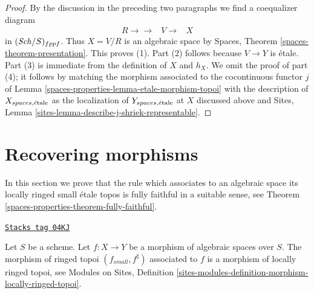 \begin{proof}
\medskip\noindent
By the discussion in the preceding two paragraphs we find a
coequalizer diagram
$$
\begin{array}{ccc}R \longrightarrow\longrightarrow & V \longrightarrow & X\end{array}
$$
in $(\mathit{Sch}/S)_{fppf}$. Thus $X = V/R$ is an algebraic space by
Spaces, Theorem \ref{spaces-theorem-presentation}. This proves (1).
Part (2) follows because $V \to Y$ is \'etale. Part (3) is immediate
from the definition of $X$ and $h_X$. We omit the proof of part (4);
it follows by matching the morphism associated to the cocontinuous
functor $j$ of Lemma \ref{spaces-properties-lemma-etale-morphism-topoi}
with the description of $X_{spaces, \acute{e}\text{tale}}$ as the localization
of $Y_{spaces, \acute{e}\text{tale}}$ at $X$ discussed above and
Sites, Lemma \ref{sites-lemma-describe-j-shriek-representable}.
\end{proof}

\section{Recovering morphisms}
\label{spaces-properties-section-morphisms}
In this section we prove that the rule which associates to an algebraic space
its locally ringed small \'etale topos is fully faithful in a suitable
sense, see
Theorem \ref{spaces-properties-theorem-fully-faithful}.

\begin{lemma}
\label{spaces-properties-lemma-morphism-locally-ringed}
\href{https://stacks.math.columbia.edu/tag/04KJ}{\texttt{Stacks tag 04KJ}}

Let $S$ be a scheme.
Let $f : X \to Y$ be a morphism of algebraic spaces over $S$.
The morphism of ringed topoi $(f_{small}, f^\sharp)$
associated to $f$ is a morphism of locally ringed topoi, see
Modules on Sites,
Definition \ref{sites-modules-definition-morphism-locally-ringed-topoi}.
\end{lemma}

